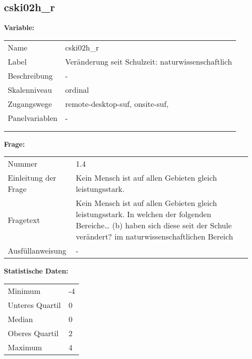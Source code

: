 	
	
	\subsection{cski02h\_r}
	\label{subSection:cski02h_r}

	\noindent\textbf{Variable:}\\
		\begin{tabular}{lL{11.3cm}}
			\label{tableVariable:cski02h_r}
			Name & cski02h\_r \\
			Label & Veränderung seit Schulzeit: naturwissenschaftlich \\
			Beschreibung & - \\
			Skalenniveau & ordinal \\
			Zugangswege &
				remote-desktop-suf,
				onsite-suf,
 \\
			Panelvariablen & -
			 \\
			 \\
 \\
		\end{tabular}

		\vspace*{1 cm}
		\noindent\textbf{Frage:}\\
		\begin{tabular}{lL{11.3cm}}
			\label{tableQuestion:cski02h_r}
			Nummer & 1.4 \\
			Einleitung der Frage & Kein Mensch ist auf allen Gebieten gleich leistungsstark. \\
			Fragetext & Kein Mensch ist auf allen Gebieten gleich leistungsstark. In welchen der folgenden Bereiche…
(b) haben sich diese seit der Schule verändert?
im naturwissenschaftlichen Bereich \\
			Ausfüllanweisung & - \\
		\end{tabular}


		\vspace*{1 cm}
		\noindent\textbf{Statistische Daten:}\\
			\begin{tabular}{ll}
				\label{tableStatistics:cski02h_r}
					Minimum & -4 \\
					Unteres Quartil & 0 \\
					Median & 0 \\
					Oberes Quartil & 2 \\
					Maximum & 4 \\
			\end{tabular}



